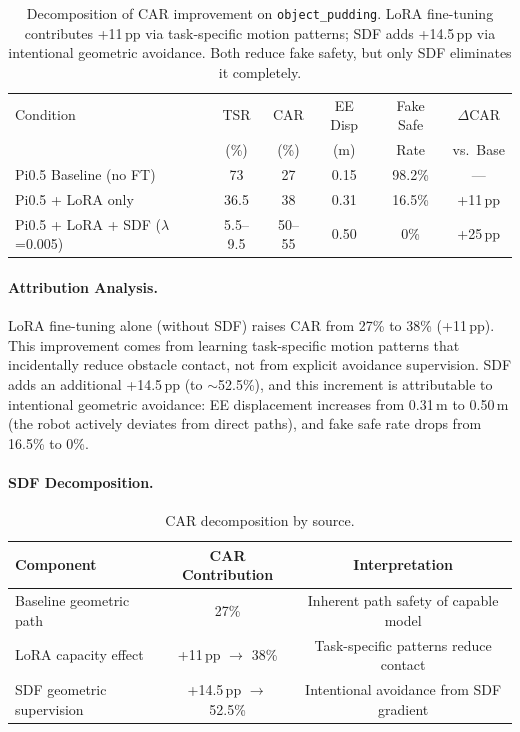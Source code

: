 \documentclass[10pt,twocolumn]{article}
\begin{document}
\begin{table}[h]
\centering
\caption{Decomposition of CAR improvement on \texttt{object\_pudding}. LoRA fine-tuning contributes +11\,pp via task-specific motion patterns; SDF adds +14.5\,pp via intentional geometric avoidance. Both reduce fake safety, but only SDF eliminates it completely.}
\label{tab:lora_attribution}
\small
\begin{tabular}{lccccc}
\toprule
Condition & TSR & CAR & EE Disp & Fake Safe & $\Delta$CAR \\
 & (\%) & (\%) & (m) & Rate & vs.\ Base \\
\midrule
Pi0.5 Baseline (no FT) & 73 & 27 & 0.15 & 98.2\% & --- \\
Pi0.5 + LoRA only & 36.5 & 38 & 0.31 & 16.5\% & +11\,pp \\
Pi0.5 + LoRA + SDF ($\lambda$=0.005) & 5.5--9.5 & 50--55 & 0.50 & 0\% & +25\,pp \\
\bottomrule
\end{tabular}
\end{table}

\paragraph{Attribution Analysis.}
LoRA fine-tuning alone (without SDF) raises CAR from 27\% to 38\% (+11\,pp). This improvement comes from learning task-specific motion patterns that incidentally reduce obstacle contact, not from explicit avoidance supervision. SDF adds an additional +14.5\,pp (to $\sim$52.5\%), and this increment is attributable to intentional geometric avoidance: EE displacement increases from 0.31\,m to 0.50\,m (the robot actively deviates from direct paths), and fake safe rate drops from 16.5\% to 0\%.

\paragraph{SDF Decomposition.}
\begin{table}[h]
\centering
\caption{CAR decomposition by source.}
\label{tab:decomposition}
\small
\begin{tabular}{lcc}
\toprule
Component & CAR Contribution & Interpretation \\
\midrule
Baseline geometric path & 27\% & Inherent path safety of capable model \\
LoRA capacity effect & +11\,pp $\to$ 38\% & Task-specific patterns reduce contact \\
SDF geometric supervision & +14.5\,pp $\to$ 52.5\% & Intentional avoidance from SDF gradient \\
\bottomrule
\end{tabular}
\end{table}
\end{document}
